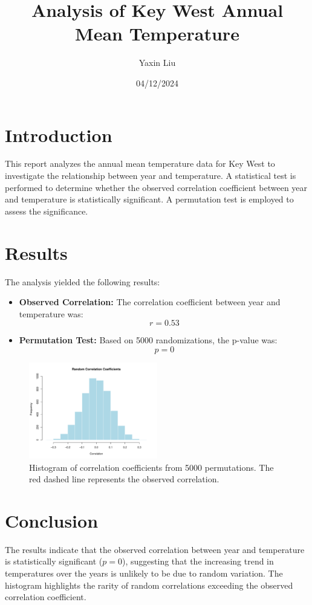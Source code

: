 \documentclass[a4paper,10pt]{article}
\title{\textbf{Analysis of Key West Annual Mean Temperature}}
\author{Yaxin Liu}
\date{04/12/2024}
\begin{document}
\maketitle
\section*{Introduction}
This report analyzes the annual mean temperature data for Key West to investigate the relationship between year and temperature. A statistical test is performed to determine whether the observed correlation coefficient between year and temperature is statistically significant. A permutation test is employed to assess the significance.
\section*{Results}
The analysis yielded the following results:
\begin{itemize}
    \item \textbf{Observed Correlation:} The correlation coefficient between year and temperature was:
    \[
    r = 0.53
    \]
    \item \textbf{Permutation Test:} Based on 5000 randomizations, the p-value was:
    \[
    p = 0
    \]
\end{itemize}
\begin{figure}[h!]
    \centering
    \includegraphics[width=0.5\textwidth, height=0.3\textheight]{../results/Florida.pdf}
    \caption{Histogram of correlation coefficients from 5000 permutations. The red dashed line represents the observed correlation.}
    \label{fig:histogram}
\end{figure}
\section*{Conclusion}
The results indicate that the observed correlation between year and temperature is statistically significant (\(p = 0\)), suggesting that the increasing trend in temperatures over the years is unlikely to be due to random variation. The histogram highlights the rarity of random correlations exceeding the observed correlation coefficient.
\immediate{}
\end{document}
